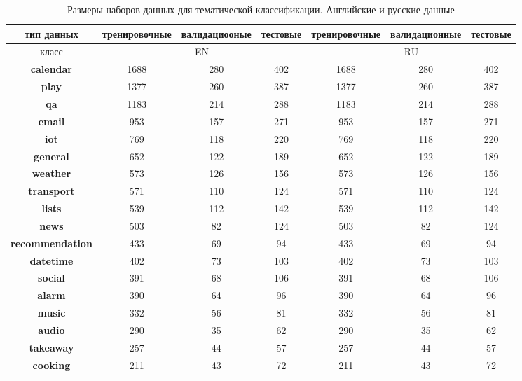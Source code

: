 \begin{table}
\caption{Размеры наборов данных для тематической классификации. Английские и русские данные}
\label{topic_sizes_tr-ag}
\begin{tabular}{|c||c|c|c|c|c|c|} \hline
{тип данных} & {тренировочные} & {валидациооные} & {тестовые} & {тренировочные} & {валидационные} & {тестовые} \\ \hline
{класс} & \multicolumn{3}{c|}{EN} & \multicolumn{3}{c|}{RU} \\ \hline \hline
  \textbf{calendar}& 1688 & 280 & 402 & 1688 & 280 & 402\\ \hline
  \textbf{play}& 1377 & 260 & 387 & 1377 & 260 & 387\\ \hline
  \textbf{qa}& 1183 & 214 & 288 & 1183 & 214 & 288\\ \hline
  \textbf{email}& 953 & 157 & 271 & 953 & 157 & 271\\ \hline
  \textbf{iot}& 769 & 118 & 220 & 769 & 118 & 220\\ \hline
  \textbf{general}& 652 & 122 & 189 & 652 & 122 & 189\\ \hline
  \textbf{weather}& 573 & 126 & 156 & 573 & 126 & 156\\ \hline
  \textbf{transport}& 571 & 110 & 124 & 571 & 110 & 124\\ \hline
  \textbf{lists}& 539 & 112 & 142 & 539 & 112 & 142\\ \hline
  \textbf{news}& 503 & 82 & 124 & 503 & 82 & 124\\ \hline
  \textbf{recommendation}& 433 & 69 & 94 & 433 & 69 & 94\\ \hline
  \textbf{datetime}& 402 & 73 & 103 & 402 & 73 & 103\\ \hline
  \textbf{social}& 391 & 68 & 106 & 391 & 68 & 106\\ \hline
  \textbf{alarm}& 390 & 64 & 96 & 390 & 64 & 96\\ \hline
  \textbf{music}& 332 & 56 & 81 & 332 & 56 & 81\\ \hline
  \textbf{audio}& 290 & 35 & 62 & 290 & 35 & 62\\ \hline
  \textbf{takeaway}& 257 & 44 & 57 & 257 & 44 & 57\\ \hline
  \textbf{cooking}& 211 & 43 & 72 & 211 & 43 & 72\\ \hline

\end{tabular}
\end{table}

